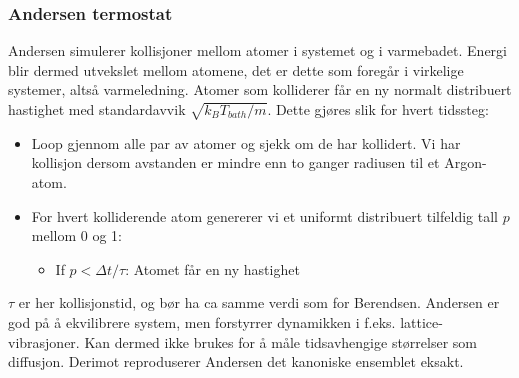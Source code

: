 \documentclass[english, a4paper]{article}
\begin{document}
\subsubsection{Andersen termostat}
Andersen simulerer kollisjoner mellom atomer i systemet og i varmebadet. Energi blir dermed
utvekslet mellom atomene, det er dette som foregår i virkelige systemer, altså varmeledning.
Atomer som kolliderer
får en ny normalt distribuert hastighet med standardavvik $\sqrt{k_BT_{bath}/m}$. 
Dette gjøres slik for hvert tidssteg:
\begin{itemize}
 \item Loop gjennom alle par av atomer og sjekk om de har kollidert. Vi har kollisjon
       dersom avstanden er mindre enn to ganger radiusen til et Argon-atom.
 \item For hvert kolliderende atom genererer vi et uniformt distribuert tilfeldig tall $p$ mellom 
       0 og 1:
       \begin{itemize}
       \item If $p < \Delta t/\tau$: Atomet får en ny hastighet
       \end{itemize}
\end{itemize}
$\tau$ er her kollisjonstid, og bør ha ca samme verdi som for Berendsen. 
Andersen er god på å ekvilibrere system, men forstyrrer dynamikken i f.eks. lattice-vibrasjoner. 
Kan dermed ikke brukes for å måle tidsavhengige størrelser som diffusjon.
Derimot reproduserer Andersen det kanoniske ensemblet eksakt. \\
\end{document}
